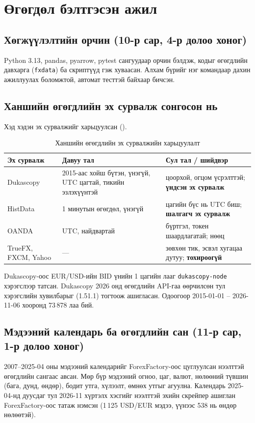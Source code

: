 \chapter{Өгөгдөл бэлтгэсэн ажил}
\label{ch:methodology}

\section{Хөгжүүлэлтийн орчин (10-р сар, 4-р долоо хоног)}
Python 3.13, pandas, pyarrow, pytest сангуудаар орчин бэлдэж, кодыг өгөгдлийн давхарга (\texttt{fxdata}) ба
скриптүүд гэж хуваасан. Алхам бүрийг нэг командаар дахин ажиллуулах боломжтой, автомат тесттэй байхаар бичсэн.

\section{Ханшийн өгөгдлийн эх сурвалж сонгосон нь}
Хэд хэдэн эх сурвалжийг харьцуулсан ().

\begin{table}[H]
\centering
\caption{Ханшийн өгөгдлийн эх сурвалжийн харьцуулалт}
\label{tab:sources}
\small
\begin{tabular}{p{2.6cm}p{5.2cm}p{5.4cm}}
\toprule
\textbf{Эх сурвалж} & \textbf{Давуу тал} & \textbf{Сул тал / шийдвэр} \\
\midrule
Dukascopy & 2015-аас хойш бүтэн, үнэгүй, UTC цагтай, тикийн эзлэхүүнтэй & цоорхой, огцом үсрэлттэй; \textbf{үндсэн эх сурвалж} \\
HistData & 1 минутын өгөгдөл, үнэгүй & цагийн бүс нь UTC биш; \textbf{шалгагч эх сурвалж} \\
OANDA & UTC, найдвартай & бүртгэл, токен шаардлагатай; нөөц \\
TrueFX, FXCM, Yahoo & --- & зөвхөн тик, эсвэл хугацаа дутуу; \textbf{тохироогүй} \\
\bottomrule
\end{tabular}
\end{table}

Dukascopy-оос EUR/USD-ийн BID үнийн 1 цагийн лааг \texttt{dukascopy-node} хэрэгслээр татсан. Dukascopy 2026 онд
өгөгдлийн API-гаа өөрчилсөн тул хэрэгслийн хувилбарыг (1.51.1) тогтоож ашигласан. Одоогоор 2015-01-01 -- 2026-11-06
хооронд 73\,878 лаа бий.

\section{Мэдээний календарь ба өгөгдлийн сан (11-р сар, 1-р долоо хоног)}
2007--2025-04 оны мэдээний календарийг ForexFactory-оос цуглуулсан нээлттэй өгөгдлийн сангаас \cite{ffdataset} авсан.
Мөр бүр мэдээний огноо, цаг, валют, нөлөөний түвшин (бага, дунд, өндөр), бодит утга, хүлээлт, өмнөх утгыг агуулна.
Календарь 2025-04-нд дуусдаг тул 2026-11 хүртэлх хэсгийг нээлттэй эхийн скрейпер \cite{ffscraper} ашиглан
ForexFactory-оос татаж нэмсэн (1\,125 USD/EUR мэдээ, үүнээс 538 нь өндөр нөлөөтэй).

